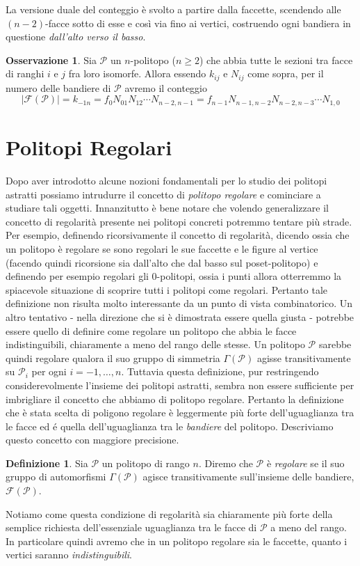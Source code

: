 \documentclass[a4paper,12pt]{report}
\newcommand{\p}{\mathcal{P}}
\theoremstyle{plain}
\theoremstyle{definition}
\newtheorem{defin}[teo]{Definizione}
\newtheorem{oss}[teo]{Osservazione}
\begin{document}
La versione duale del conteggio \`e svolto a partire dalla faccette, scendendo alle $(n-2)$-facce sotto di esse e cos\`i via fino ai vertici,
costruendo ogni bandiera in questione \emph{dall'alto verso il basso}.
\begin{oss}
Sia $\p$ un $n$-politopo ($n\geq 2$) che abbia tutte le sezioni tra facce di ranghi $i$ e $j$ fra loro isomorfe.
Allora essendo $k_{ij}$ e $N_{ij}$ come sopra, per il numero delle bandiere di $\p$ avremo il conteggio
\begin{equation}
\left|\mathcal{F}(\p)\right|=k_{-1n}=f_0N_{01}N_{12}\cdots N_{n-2,n-1}=f_{n-1}N_{n-1,n-2}N_{n-2,n-3}\cdots N_{1,0}
\end{equation}
\end{oss}

\section{Politopi Regolari}
Dopo aver introdotto alcune nozioni fondamentali per lo studio dei politopi astratti possiamo intrudurre il concetto di \emph{politopo regolare} e
cominciare a studiare tali oggetti. Innanzitutto \`e bene notare che volendo generalizzare il concetto di regolarit\`a presente nei politopi concreti
potremmo tentare pi\`u strade. Per esempio, definendo ricorsivamente il concetto di regolarit\`a, dicendo ossia che un politopo \`e regolare se sono
regolari le sue faccette e le figure al vertice (facendo quindi ricorsione sia dall'alto che dal basso sul poset-politopo) e definendo per esempio regolari
gli $0$-politopi, ossia i punti allora otterremmo la spiacevole situazione di scoprire tutti i politopi come regolari. Pertanto tale definizione non risulta
molto interessante da un punto di vista combinatorico.
Un altro tentativo - nella direzione che si \`e dimostrata essere quella giusta - potrebbe essere quello di definire come regolare un politopo che abbia le
facce indistinguibili, chiaramente a meno del rango delle stesse. Un politopo $\p$ sarebbe quindi regolare qualora il suo gruppo di simmetria
$\Gamma(\p)$ agisse transitivamente su $\p_i$ per ogni $i=-1,\dots,n$. Tuttavia questa definizione, pur restringendo considerevolmente l'insieme dei
politopi astratti, sembra non essere sufficiente per imbrigliare il concetto che abbiamo di politopo regolare.
Pertanto la definizione che \`e stata scelta di poligono regolare \`e leggermente pi\`u forte dell'uguaglianza tra le facce ed \'e quella dell'uguaglianza
tra le \emph{bandiere} del politopo. Descriviamo questo concetto con maggiore precisione.
\begin{defin}
Sia $\p$ un politopo di rango $n$. Diremo che $\p$ \`e \emph{regolare} se il suo gruppo di automorfismi $\Gamma(\p)$ agisce transitivamente sull'insieme
delle bandiere, $\mathcal{F}(\p)$.
\end{defin}
Notiamo come questa condizione di regolarit\`a sia chiaramente pi\`u forte della semplice richiesta dell'essenziale uguaglianza tra le facce di $\p$ a meno
del rango. In particolare quindi avremo che in un politopo regolare sia le faccette, quanto i vertici saranno \emph{indistinguibili}.
\end{document}
